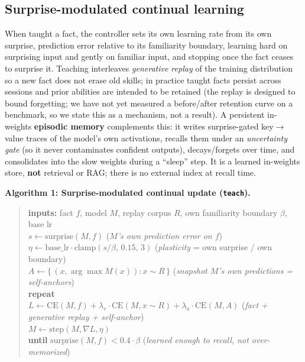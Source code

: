 \documentclass[11pt]{article}
\newcommand{\code}[1]{\texttt{#1}}
\begin{document}
\subsection{Surprise-modulated continual learning}
When taught a fact, the controller sets its own learning rate from its own surprise, prediction error relative to its familiarity boundary, learning hard on surprising input and gently on familiar input, and stopping once the fact ceases to surprise it. Teaching interleaves \emph{generative replay} of the training distribution so a new fact does not erase old skills; in practice taught facts persist across sessions and prior abilities are intended to be retained (the replay is designed to bound forgetting; we have not yet measured a before/after retention curve on a benchmark, so we state this as a mechanism, not a result). A persistent in-weights \textbf{episodic memory} complements this: it writes surprise-gated key$\to$value traces of the model's own activations, recalls them under an \emph{uncertainty gate} (so it never contaminates confident outputs), decays/forgets over time, and consolidates into the slow weights during a ``sleep'' step. It is a learned in-weights store, \textbf{not} retrieval or RAG; there is no external index at recall time.

\noindent\textbf{Algorithm 1: Surprise-modulated continual update (\code{teach}).}
\begin{quote}\small
\textbf{inputs:} fact $f$, model $M$, replay corpus $R$, own familiarity boundary $\beta$, base lr\\
$s \leftarrow \mathrm{surprise}(M, f)$ \quad (\textit{$M$'s own prediction error on $f$})\\
$\eta \leftarrow \text{base\_lr} \cdot \mathrm{clamp}(s/\beta,\, 0.15,\, 3)$ \quad (\textit{plasticity} = own surprise / own boundary)\\
$A \leftarrow \{\, (x, \arg\max M(x)) : x \sim R \,\}$ \quad (\textit{snapshot $M$'s own predictions = self-anchors})\\
\textbf{repeat}\\
\quad $L \leftarrow \mathrm{CE}(M, f) + \lambda_r\cdot\mathrm{CE}(M, x{\sim}R) + \lambda_a\cdot\mathrm{CE}(M, A)$ \quad (\textit{fact + generative replay + self-anchor})\\
\quad $M \leftarrow \mathrm{step}(M, \nabla L, \eta)$\\
\textbf{until} $\mathrm{surprise}(M, f) < 0.4\cdot\beta$ \quad (\textit{learned enough to recall, not over-memorized})
\end{quote}
\end{document}
